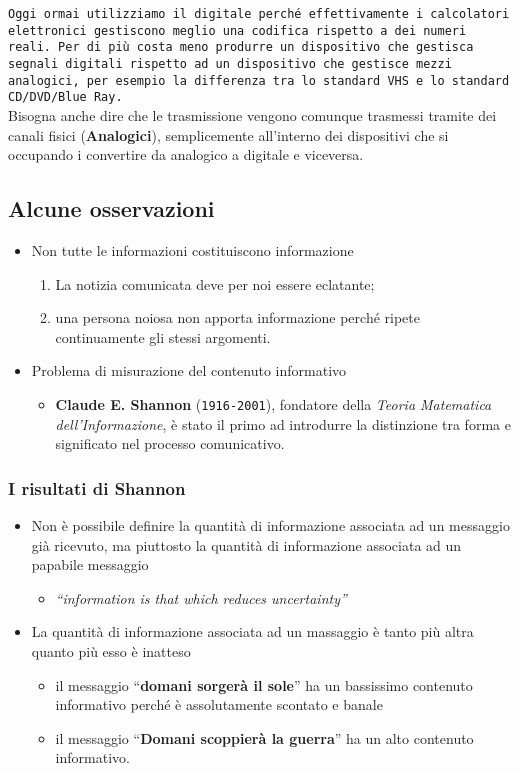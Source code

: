 \documentclass{book}
\begin{document}
\texttt{Oggi ormai utilizziamo il digitale perché effettivamente i calcolatori
elettronici gestiscono meglio una codifica rispetto a dei numeri reali. Per di
più costa meno produrre un dispositivo che gestisca segnali digitali rispetto
ad un dispositivo che gestisce mezzi analogici, per esempio la differenza tra
lo standard VHS e lo standard CD/DVD/Blue Ray.}\\
Bisogna anche dire che le trasmissione vengono comunque trasmessi tramite dei
canali fisici ({\bf Analogici}), semplicemente all'interno dei dispositivi che si
occupando i convertire da analogico a digitale e viceversa.
\subsection{Alcune osservazioni}
\begin{itemize}
	\item Non tutte le informazioni costituiscono informazione
		\begin{enumerate}
			\item La notizia comunicata deve per noi essere eclatante;
			\item una persona noiosa non apporta informazione perché ripete
				continuamente gli stessi argomenti.
		\end{enumerate}
	\item Problema di misurazione del contenuto informativo
		\begin{itemize}
			\item {\bf Claude E. Shannon} ({\tt 1916-2001}), fondatore della
				\textit{Teoria Matematica dell'Informazione}, è stato il primo
				ad introdurre la distinzione tra forma e significato nel
				processo comunicativo.
		\end{itemize}
\end{itemize}
\subsubsection{I risultati di Shannon}
\begin{itemize}
	\item Non è possibile definire la quantità di informazione associata ad un
		messaggio già ricevuto, ma piuttosto la quantità di informazione
		associata ad un papabile messaggio
		\begin{itemize}
			\item \textit{``information is that which reduces uncertainty''}
		\end{itemize}
	\item La quantità di informazione associata ad un massaggio è tanto più
		altra quanto più esso è inatteso
		\begin{itemize}
			\item il messaggio ``{\bf domani sorgerà il sole}'' ha un bassissimo
				contenuto informativo perché è assolutamente scontato e banale
			\item il messaggio ``{\bf Domani scoppierà la guerra}'' ha un alto
				contenuto informativo.
		\end{itemize}
\end{itemize}
\end{document}
